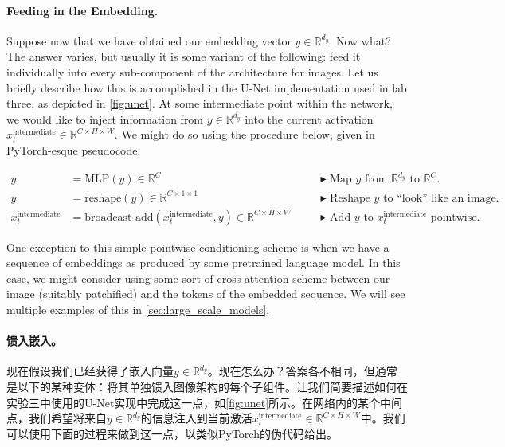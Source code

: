 \paragraph{Feeding in the Embedding.} Suppose now that we have obtained our embedding vector $y \in \mathbb{R}^{d_y}$. Now what? The answer varies, but usually it is some variant of the following: feed it individually into every sub-component of the architecture for images. Let us briefly describe how this is accomplished in the U-Net implementation used in lab three, as depicted in \cref{fig:unet}. At some intermediate point within the network, we would like to inject information from $y \in \mathbb{R}^{d_y}$ into the current activation $x^{\text{intermediate}}_t \in \mathbb{R}^{C \times H \times W}$. We might do so using the procedure below, given in PyTorch-esque pseudocode.

\begin{align*}
    y &= \text{MLP}(y) \in \mathbb{R}^C\quad 
    && \blacktriangleright\,\,\text{Map $y$ from $\mathbb{R}^{d_y}$ to $\mathbb{R}^C$.}\\
    y &= \text{reshape}(y) \in \mathbb{R}^{C \times 1 \times 1}\quad 
    && \blacktriangleright\,\,\text{Reshape $y$ to ``look'' like an image.}\\
    x^{\text{intermediate}}_t &= \text{broadcast\_add}(x^{\text{intermediate}}_t,y) \in \mathbb{R}^{C \times H \times W}\quad && \blacktriangleright\,\,\text{Add $y$ to $x^{\text{intermediate}}_t$ pointwise.}
\end{align*}

One exception to this simple-pointwise conditioning scheme is when we have a sequence of embeddings as produced by some pretrained language model. In this case, we might consider using some sort of cross-attention scheme between our image (suitably patchified) and the tokens of the embedded sequence. We will see multiple examples of this in \cref{sec:large_scale_models}.

\paragraph{馈入嵌入。} 现在假设我们已经获得了嵌入向量$y \in \mathbb{R}^{d_y}$。现在怎么办？答案各不相同，但通常是以下的某种变体：将其单独馈入图像架构的每个子组件。让我们简要描述如何在实验三中使用的U-Net实现中完成这一点，如\cref{fig:unet}所示。在网络内的某个中间点，我们希望将来自$y \in \mathbb{R}^{d_y}$的信息注入到当前激活$x^{\text{intermediate}}_t \in \mathbb{R}^{C \times H \times W}$中。我们可以使用下面的过程来做到这一点，以类似PyTorch的伪代码给出。

